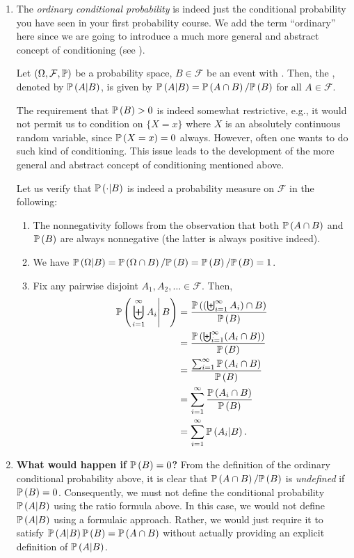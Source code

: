 \begin{enumerate}
\item The \emph{ordinary conditional probability} is indeed just the
conditional probability you have seen in your first probability course. We add
the term ``ordinary'' here since we are going to introduce a much more general
and abstract  concept of conditioning (see
).

Let \((\Omega,\mathcal{F},\mathbb{P})\) be a probability space, \(B\in\mathcal{F}\) be
an event with . Then, the , denoted by \(\mathbb{P}\left(A|B\right)\), is given by
\(\mathbb{P}\left(A|B\right)=\mathbb{P}\left(A\cap B\right)/\mathbb{P}\left(B\right)\) for all \(A\in\mathcal{F}\).
\begin{note}
The requirement that \(\mathbb{P}\left(B\right)>0\) is indeed somewhat restrictive, e.g., it
would not permit us to condition on \(\{X=x\}\) where \(X\) is an absolutely
continuous random variable, since \(\mathbb{P}\left(X=x\right)=0\) always. However, often one
wants to do such kind of conditioning. This issue leads to the development of
the more general and abstract concept of conditioning mentioned above.
\end{note}

Let us verify that \(\mathbb{P}\left(\cdot|B\right)\) is indeed a probability measure on
\(\mathcal{F}\) in the following:

\begin{pf}
\begin{enumerate}[label={(\arabic*)}]
\item The nonnegativity follows from the observation that both \(\mathbb{P}\left(A\cap
B\right)\) and \(\mathbb{P}\left(B\right)\) are always nonnegative (the latter is always positive
indeed).
\item We have \(\mathbb{P}\left(\Omega|B\right)=\mathbb{P}\left(\Omega\cap B\right)/\mathbb{P}\left(B\right)=\mathbb{P}\left(B\right)/\mathbb{P}\left(B\right)=1\).
\item Fix any pairwise disjoint \(A_1,A_2,\dotsc\in\mathcal{F}\). Then,
\begin{align*}
\mathbb{P}\left(\left.\biguplus_{i=1}^{\infty}A_i\right|B\right)
&=\frac{\mathbb{P}\left(\left(\biguplus_{i=1}^{\infty}A_i\right)\cap B\right)}{\mathbb{P}\left(B\right)} \\
&=\frac{\mathbb{P}\left(\biguplus_{i=1}^{\infty}(A_i\cap B)\right)}{\mathbb{P}\left(B\right)} \\
&=\frac{\sum_{i=1}^{\infty}\mathbb{P}\left(A_i\cap B\right)}{\mathbb{P}\left(B\right)} \\
&=\sum_{i=1}^{\infty}\frac{\mathbb{P}\left(A_i\cap B\right)}{\mathbb{P}\left(B\right)} \\
&=\sum_{i=1}^{\infty}\mathbb{P}\left(A_i|B\right).
\end{align*}
\end{enumerate}
\end{pf}
\item \textbf{What would happen if \(\mathbb{P}\left(B\right)=0\)?} From the definition of
the ordinary conditional probability above, it is clear that \(\mathbb{P}\left(A\cap
B\right)/\mathbb{P}\left(B\right)\) is \emph{undefined} if \(\mathbb{P}\left(B\right)=0\). Consequently, we must not
define the conditional probability \(\mathbb{P}\left(A|B\right)\) using the ratio formula above.
In this case, we would not define \(\mathbb{P}\left(A|B\right)\) using a formulaic approach.
Rather, we would just require it to satisfy \(\mathbb{P}\left(A|B\right)\mathbb{P}\left(B\right)=\mathbb{P}\left(A\cap
B\right)\) without actually providing an explicit definition of \(\mathbb{P}\left(A|B\right)\).


\end{enumerate}
